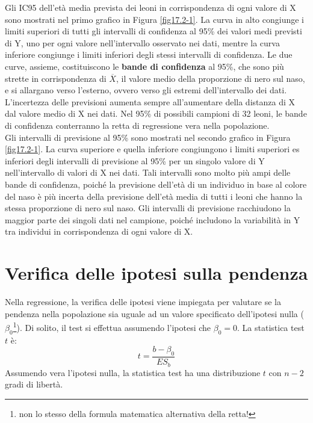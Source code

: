 \documentclass[10pt, draft]{book}
\begin{document}
Gli IC95 dell'età media prevista dei leoni in corrispondenza di ogni valore di X sono mostrati nel primo grafico in Figura \ref{fig17.2-1}. La curva in alto congiunge i limiti superiori di tutti gli intervalli di confidenza al 95\% dei valori medi previsti di Y, uno per ogni valore nell'intervallo osservato nei dati, mentre la curva inferiore congiunge i limiti inferiori degli stessi intervalli di confidenza. Le due curve, assieme, costituiscono le \textbf{bande di confidenza} al 95\%, che sono più strette in corrispondenza di $\overline{X}$, il valore medio della proporzione di nero sul naso, e si allargano verso l'esterno, ovvero verso gli estremi dell'intervallo dei dati. L'incertezza delle previsioni aumenta sempre all'aumentare della distanza di X dal valore medio di X nei dati. Nel 95\% di possibili campioni di 32 leoni, le bande di confidenza conterranno la retta di regressione vera nella popolazione.\\
Gli intervalli di previsione al 95\% sono mostrati nel secondo grafico in Figura \ref{fig17.2-1}. La curva superiore e quella inferiore congiungono i limiti superiori es inferiori degli intervalli di previsione al 95\% per un singolo valore di Y nell'intervallo di valori di X nei dati. Tali intervalli sono molto più ampi delle bande di confidenza, poiché la previsione dell'età di un individuo in base al colore del naso è più incerta della previsione dell'età media di tutti i leoni che hanno la stessa proporzione di nero sul naso. Gli intervalli di previsione racchiudono la maggior parte dei singoli dati nel campione, poiché includono la variabilità in Y tra individui in corrispondenza di ogni valore di X.

\section{Verifica delle ipotesi sulla pendenza}

Nella regressione, la verifica delle ipotesi viene impiegata per valutare se la pendenza nella popolazione sia uguale ad un valore specificato dell'ipotesi nulla ($\beta_0$\footnote{non lo stesso della formula matematica alternativa della retta!}). Di solito, il test si effettua assumendo l'ipotesi che $\beta_0 = 0$. La statistica test $t$ è:
\begin{equation}
    t = \frac{b-\beta_0}{ES_b}
\end{equation}
Assumendo vera l'ipotesi nulla, la statistica test ha una distribuzione $t$ con $n-2$ gradi di libertà.
\end{document}
